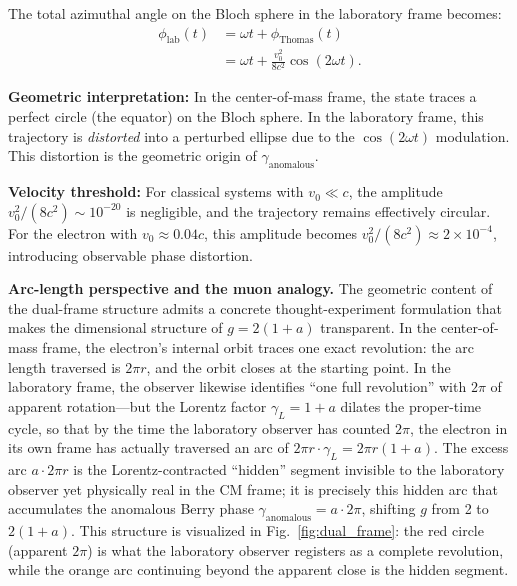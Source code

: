 \documentclass[%
 reprint,
 amsmath,amssymb,
 aps,
 prb,
]{revtex4-2}
\numberwithin{equation}{section}
\theoremstyle{definition}
\theoremstyle{remark}
\begin{document}
The total azimuthal angle on the Bloch sphere in the laboratory frame becomes:
\begin{equation}
\begin{split}
\phi_{\text{lab}}(t) &= \omega t + \phi_{\text{Thomas}}(t) \\
&= \omega t + \frac{v_0^2}{8c^2}\cos(2\omega t).
\end{split}
\label{eq:phi_lab_distorted}
\end{equation}

\textbf{Geometric interpretation:} In the center-of-mass frame, the state traces a perfect circle (the equator) on the Bloch sphere. In the laboratory frame, this trajectory is \emph{distorted} into a perturbed ellipse due to the $\cos(2\omega t)$ modulation. This distortion is the geometric origin of $\gamma_{\text{anomalous}}$.

\textbf{Velocity threshold:} For classical systems with $v_0 \ll c$, the amplitude $v_0^2/(8c^2) \sim 10^{-20}$ is negligible, and the trajectory remains effectively circular. For the electron with $v_0 \approx 0.04c$, this amplitude becomes $v_0^2/(8c^2) \approx 2 \times 10^{-4}$, introducing observable phase distortion.

\textbf{Arc-length perspective and the muon analogy.} The geometric content of the dual-frame structure admits a concrete thought-experiment formulation that makes the dimensional structure of $g = 2(1+a)$ transparent. In the center-of-mass frame, the electron's internal orbit traces one exact revolution: the arc length traversed is $2\pi r$, and the orbit closes at the starting point. In the laboratory frame, the observer likewise identifies ``one full revolution'' with $2\pi$ of apparent rotation---but the Lorentz factor $\gamma_L = 1+a$ dilates the proper-time cycle, so that by the time the laboratory observer has counted $2\pi$, the electron in its own frame has actually traversed an arc of $2\pi r \cdot \gamma_L = 2\pi r(1+a)$. The excess arc $a \cdot 2\pi r$ is the Lorentz-contracted ``hidden'' segment invisible to the laboratory observer yet physically real in the CM frame; it is precisely this hidden arc that accumulates the anomalous Berry phase $\gamma_{\text{anomalous}} = a \cdot 2\pi$, shifting $g$ from 2 to $2(1+a)$. This structure is visualized in Fig.~\ref{fig:dual_frame}: the red circle (apparent $2\pi$) is what the laboratory observer registers as a complete revolution, while the orange arc continuing beyond the apparent close is the hidden segment.
\end{document}
